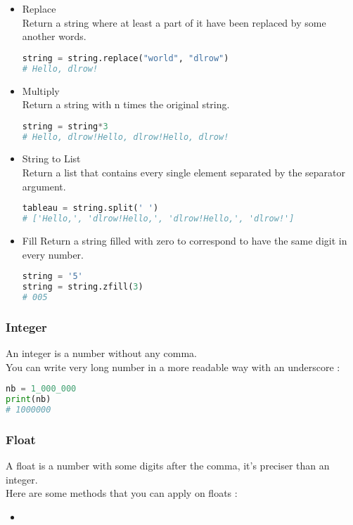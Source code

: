 \documentclass[a4paper, 12pt]{article}
\begin{document}
\begin{itemize}
\item Replace \\
Return a string where at least a part of it have been replaced by some another words.
\begin{lstlisting}[language=Python]
string = string.replace("world", "dlrow")
# Hello, dlrow!
\end{lstlisting}

\item Multiply \\
Return a string with n times the original string.
\begin{lstlisting}[language=Python]
string = string*3
# Hello, dlrow!Hello, dlrow!Hello, dlrow!
\end{lstlisting}

\item String to List \\
Return a list that contains every single element separated by the separator argument.
\begin{lstlisting}[language=Python]
tableau = string.split(' ')
# ['Hello,', 'dlrow!Hello,', 'dlrow!Hello,', 'dlrow!']
\end{lstlisting}

\item Fill
Return a string filled with zero to correspond to have the same digit in every number.
\begin{lstlisting}[language=Python]
string = '5'
string = string.zfill(3)
# 005
\end{lstlisting}

\end{itemize}

\subsubsection{Integer}
An integer is a number without any comma. \\
You can write very long number in a more readable way with an underscore : 
\begin{lstlisting}[language=Python]
nb = 1_000_000
print(nb)
# 1000000
\end{lstlisting}

\subsubsection{Float}
A float is a number with some digits after the comma, it's preciser than an integer. \\
Here are some methods that you can apply on floats : 
\begin{itemize}
\item
\end{itemize}
\end{document}
